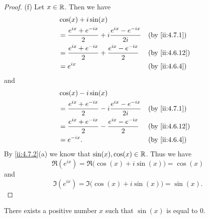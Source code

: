 \begin{proof}{(f)}
  Let \(x \in \mathbb{R}\).
  Then we have
  \begin{align*}
     & \cos(x) + i \sin(x)                                                                      \\
     & = \dfrac{e^{i x} + e^{- i x}}{2} + i \dfrac{e^{i x} - e^{- i x}}{2i} &  & \by{ii:4.7.1}  \\
     & = \dfrac{e^{i x} + e^{- i x}}{2} + \dfrac{e^{i x} - e^{- i x}}{2}    &  & \by{ii:4.6.12} \\
     & = e^{i x}                                                            &  & \by{ii:4.6.4}
  \end{align*}
  and
  \begin{align*}
     & \cos(x) - i \sin(x)                                                                      \\
     & = \dfrac{e^{i x} + e^{- i x}}{2} - i \dfrac{e^{i x} - e^{- i x}}{2i} &  & \by{ii:4.7.1}  \\
     & = \dfrac{e^{i x} + e^{- i x}}{2} - \dfrac{e^{i x} - e^{- i x}}{2}    &  & \by{ii:4.6.12} \\
     & = e^{- i x}.                                                         &  & \by{ii:4.6.4}
  \end{align*}
  By \cref{ii:4.7.2}(a) we know that \(\sin(x), \cos(x) \in \mathbb{R}\).
  Thus we have
  \[
    \Re(e^{i x}) = \Re\big(\cos(x) + i \sin(x)\big) = \cos(x)
  \]
  and
  \[
    \Im(e^{i x}) = \Im\big(\cos(x) + i \sin(x)\big) = \sin(x).
  \]
\end{proof}

\begin{lem}\label{ii:4.7.3}
  There exists a positive number \(x\) such that \(\sin(x)\) is equal to \(0\).
\end{lem}


